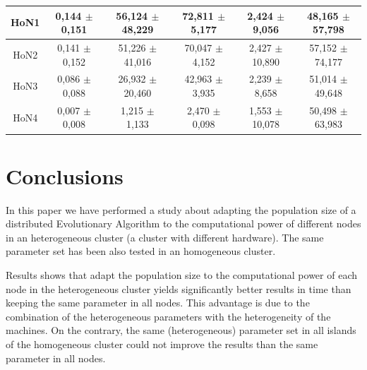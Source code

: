 \documentclass[final,1p,times]{elsarticle}
\begin{document}
\begin{table}[htb]
{\begin{tabular}{|c|c|c|c|c|c|}
HoN1 &   0,144 $\pm$  0,151 &  56,124 $\pm$ 48,229 & 72,811 $\pm$ 5,177  & 2,424 $\pm$  9,056  & 48,165  $\pm$57,798 \\ \hline
HoN2 &   0,141 $\pm$  0,152 &  51,226 $\pm$ 41,016 & 70,047 $\pm$ 4,152  & 2,427 $\pm$  10,890 & 57,152  $\pm$74,177 \\ \hline
HoN3 &   0,086 $\pm$  0,088 &  26,932 $\pm$ 20,460 & 42,963 $\pm$ 3,935  & 2,239 $\pm$  8,658  & 51,014  $\pm$49,648 \\ \hline
HoN4 &   0,007 $\pm$  0,008 &  1,215  $\pm$ 1,133  & 2,470  $\pm$ 0,098  & 1,553 $\pm$  10,078 & 50,498 $\pm$ 63,983 \\ \hline
\end{tabular}
}
\label{tab:onemaxtimes}
\end{table}

\section{Conclusions}
In this paper we have performed a study about adapting the
population size of a distributed Evolutionary Algorithm to the computational
power of different nodes in an heterogeneous cluster (a cluster with different hardware).
The same parameter set has been also tested in an homogeneous cluster. 

Results shows that adapt the population size to the computational power of each node in the heterogeneous cluster yields significantly
better results in time than keeping the same parameter in all nodes. This advantage is due to the combination of the heterogeneous parameters with the heterogeneity of the machines. On the contrary, the same (heterogeneous) parameter set in all islands of the homogeneous cluster could not improve the results than the same parameter in all nodes.

\end{document}
